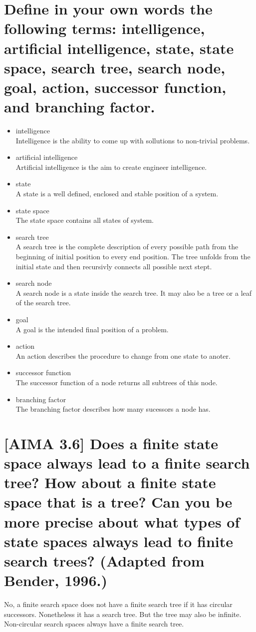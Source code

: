 \documentclass{scrreprt}
\begin{document}
\section*{Define in your own words the following terms: intelligence, artificial intelligence, state,
state space, search tree, search node, goal, action, successor function, and branching factor.}
\begin{itemize}
 \item  intelligence\\
 Intelligence is the ability to come up with sollutions to non-trivial problems.
 \item artificial intelligence\\
 Artificial intelligence is the aim to create engineer intelligence.
 \item state\\
 A state is a well defined, enclosed and stable position of a system.
 \item state space\\
 The state space contains all states of system.
 \item search tree\\
 A search tree is the complete description of every possible path from the beginning of initial position to every end position. The tree unfolds from the initial state and then recursivly connects all possible next stept.
 \item search node\\
 A search node is a state inside the search tree. It may also be a tree or a leaf of the search tree.
 \item goal\\
 A goal is the intended final position of a problem.
 \item action\\
 An action describes the procedure to change from one state to anoter.
 \item successor function\\
 The successor function of a node returns all subtrees of this node.
 \item branching factor\\
 The branching factor describes how many sucessors a node has.
\end{itemize}



\section*{[AIMA 3.6] Does a finite state space always lead to a finite search tree? How about a finite
state space that is a tree? Can you be more precise about what types of state spaces always lead to
finite search trees? (Adapted from Bender, 1996.)}
No, a finite search space does not have a finite search tree if it has circular successors. Nonetheless it has a search tree. But the tree may also be infinite. Non-circular search spaces always have a finite search tree.
\end{document}
